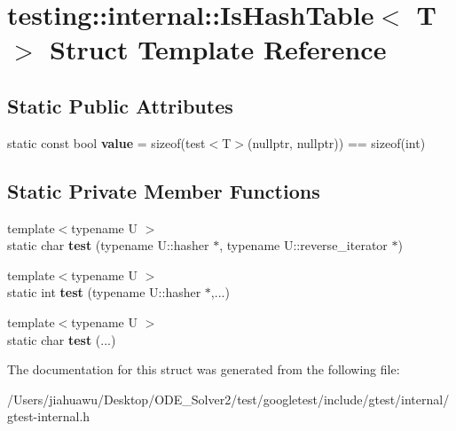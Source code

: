 \hypertarget{structtesting_1_1internal_1_1_is_hash_table}{}\section{testing\+:\+:internal\+:\+:Is\+Hash\+Table$<$ T $>$ Struct Template Reference}
\label{structtesting_1_1internal_1_1_is_hash_table}
\subsection*{Static Public Attributes}
\begin{DoxyCompactItemize}
\item 
\mbox{\label{structtesting_1_1internal_1_1_is_hash_table_a165e0a3eddfa5fadf9b950be6432d848}} 
static const bool {\bfseries value} = sizeof(test$<$T$>$(nullptr, nullptr)) == sizeof(int)
\end{DoxyCompactItemize}
\subsection*{Static Private Member Functions}
\begin{DoxyCompactItemize}
\item 
\mbox{\label{structtesting_1_1internal_1_1_is_hash_table_acc4d1e2307a1e0527932da7a7d354f06}} 
{\footnotesize template$<$typename U $>$ }\\static char {\bfseries test} (typename U\+::hasher $\ast$, typename U\+::reverse\+\_\+iterator $\ast$)
\item 
\mbox{\label{structtesting_1_1internal_1_1_is_hash_table_a195b49a6ae5090b6266a5fa4ab771962}} 
{\footnotesize template$<$typename U $>$ }\\static int {\bfseries test} (typename U\+::hasher $\ast$,...)
\item 
\mbox{\label{structtesting_1_1internal_1_1_is_hash_table_a40461295b959ff31e06241d4de072be0}} 
{\footnotesize template$<$typename U $>$ }\\static char {\bfseries test} (...)
\end{DoxyCompactItemize}


The documentation for this struct was generated from the following file\+:\begin{DoxyCompactItemize}
\item 
/\+Users/jiahuawu/\+Desktop/\+O\+D\+E\+\_\+\+Solver2/test/googletest/include/gtest/internal/gtest-\/internal.\+h\end{DoxyCompactItemize}
